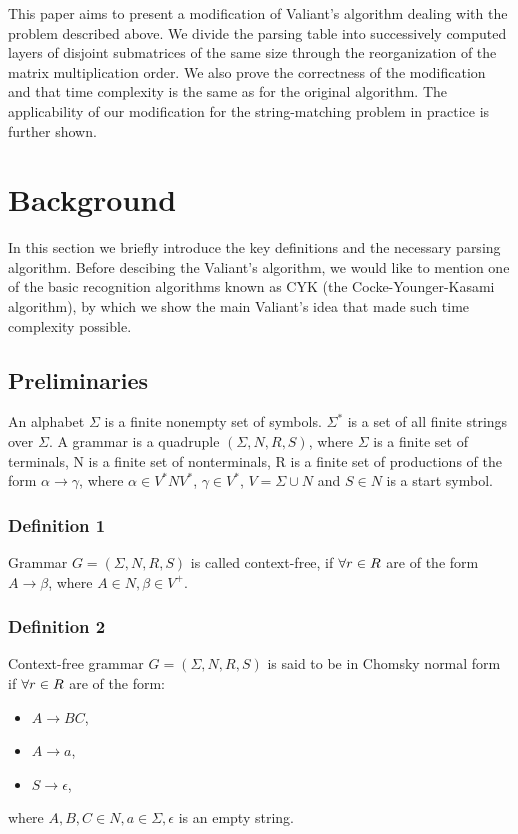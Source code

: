 \documentclass[runningheads]{llncs}
\begin{document}
This  paper  aims  to  present  a  modification  of  Valiant's  algorithm dealing with the problem described above. We divide the parsing table into successively computed layers of disjoint submatrices of the same size through the reorganization of the matrix multiplication order. We also prove the correctness of the modification and that time complexity is the same as for the original algorithm. The applicability of our modification for the string-matching problem in practice is further shown.


\section{Background}

In this section we briefly introduce the key definitions and the necessary parsing algorithm. Before descibing the Valiant's  algorithm, we would like to mention one of the basic recognition algorithms known as CYK (the Cocke-Younger-Kasami algorithm), by which we show the main Valiant's idea that made such time complexity possible.

\subsection{Preliminaries}

An alphabet $\Sigma$ is a finite nonempty set of symbols. $\Sigma^{*}$ is a set of all finite strings over $\Sigma$. 
A grammar is a quadruple $(\Sigma, N, R, S)$, where $\Sigma$ is a finite set of terminals, N is a finite set of nonterminals, R is a finite set of productions of the form $\alpha \rightarrow \gamma$, where $\alpha \in V^{*}NV^{*}$, $\gamma \in V^{*}$, $V = \Sigma \cup N$ and $S \in N$ is a start symbol. 

\subsubsection{Definition 1} Grammar $G = (\Sigma, N, R, S)$ is called context-free, if $\space\forall r \in R$ are of the form $A \rightarrow \beta$, where $A \in N, \beta \in V^{+}$. 

\subsubsection{Definition 2} Context-free grammar $G = (\Sigma, N, R, S)$ is said to be in Chomsky normal form if $\space\forall r \in R$ are of the form: 
\begin{itemize}
  \item $A \rightarrow BC$,
  \item $A \rightarrow a$,
  \item $S \rightarrow \epsilon$, 
\end{itemize}
where $A, B, C \in N, a \in \Sigma, \epsilon$ is an empty string. 
\end{document}
